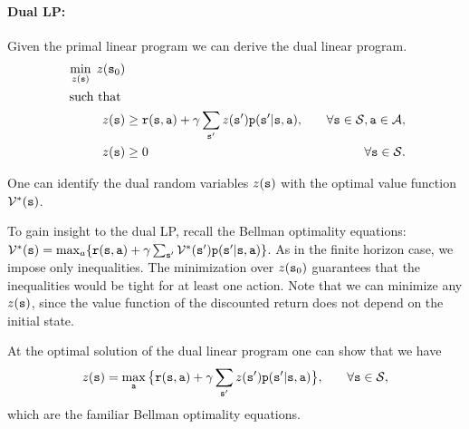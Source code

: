 \paragraph{Dual LP:}
Given the primal linear program we can derive the dual linear
program.
\begin{align*}
\min_{z(\state)}  \;z(\state_0)&\\
\mbox{ such that }\\
%
 z(\state) &\geq
\reward(\state,\action) + \discount
\sum_{\state'}z(\state')\transitionprob(\state'|\state,\action) , &\quad\forall
\state \in {\States},\action\in\Actions, \\ 
 z(\state) &\geq 0  &\quad\forall \state \in {\States}.
\end{align*}

One can identify the dual random variables $z({\tt s})$ with the
optimal value function $\mathcal{V}^*({\tt s})$. 

To gain insight to the dual LP, recall the Bellman optimality equations: 
$\mathcal{V}^*({\tt s}) =
\max_a\{ {\tt r}({\tt s},{\tt a}) + \gamma
\sum_{{\tt s}'}\mathcal{V}^*({\tt s}'){\tt p}({\tt s}'|{\tt s},{\tt a})\}$.
As in the finite horizon case, we impose only inequalities. The minimization over $z({\tt s}_0)$ guarantees that the inequalities would be tight for at least one action. Note that we can minimize any $z({\tt s})$, since the value function of the discounted return does not depend on the initial state.

At the optimal solution of
the dual linear program one can show that we have
\begin{align*}
 z({\tt s}) &= \max_{\tt a} \big\{
{\tt r}({\tt s},{\tt a}) + \gamma
\sum_{{\tt s}'}z({\tt s}'){\tt p}({\tt s}'|{\tt s},{\tt a}) \big\} ,
&\quad\forall {\tt s} \in {\mathcal{S}},
\end{align*}
which are the familiar Bellman optimality equations.

%
%
%
%

